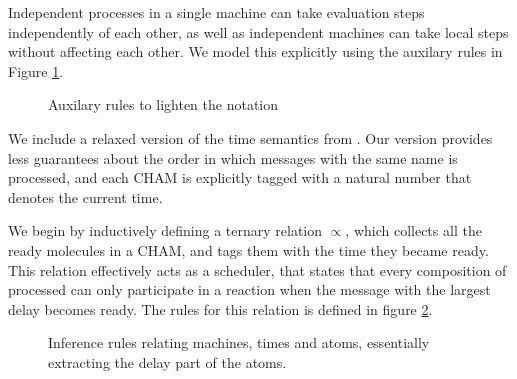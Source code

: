 Independent processes in a single machine can take evaluation steps
independently of each other, as well as independent machines can take local
steps without affecting each other. We model this explicitly using the
auxilary rules in Figure \ref{fig:rule:aux}.
\begin{figure}[!h]
\caption{Auxilary rules to lighten the notation}\label{fig:rule:aux}
\end{figure}

We include a relaxed version of the time semantics from \cite{timed-join}. Our
version provides less guarantees about the order in which messages with the
same name is processed, and each CHAM is explicitly tagged with a natural
number that denotes the current time.

We begin by inductively defining a ternary relation $\propto$, which collects
all the ready molecules in a CHAM, and tags them with the time they became
ready. This relation effectively acts as a scheduler, that states that every
composition of processed can only participate in a reaction when the message
with the largest delay becomes ready. The rules for this relation is defined in
figure \ref{fig:rule:sched}.

\begin{figure}[!h]
\caption{Inference rules relating machines, times and atoms, essentially
extracting the delay part of the atoms.}
\label{fig:rule:sched}
\end{figure}

